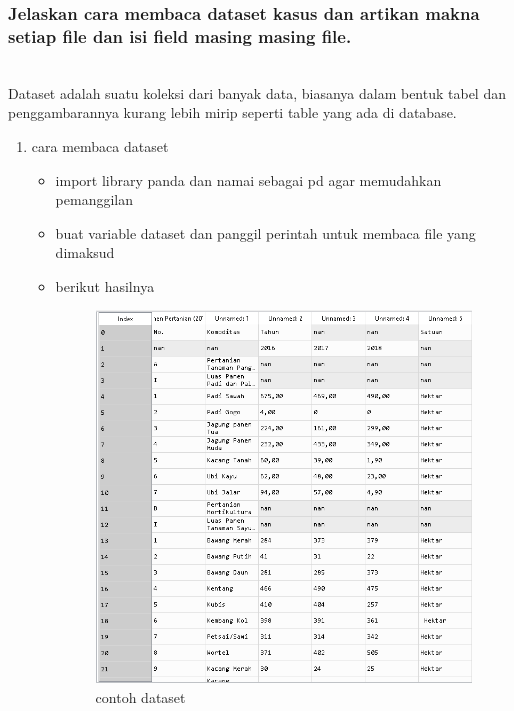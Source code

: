 \subsubsection{Jelaskan cara membaca dataset kasus dan artikan makna setiap ﬁle dan isi ﬁeld masing masing ﬁle.}
\hfill\\
Dataset adalah suatu koleksi dari banyak data, biasanya dalam bentuk tabel dan penggambarannya kurang lebih mirip seperti table yang ada di database.
\begin{enumerate}
\item cara membaca dataset
\hfill\\

	\begin{itemize}
	\item import library panda dan namai sebagai pd agar memudahkan pemanggilan
	\item buat variable dataset dan panggil perintah untuk membaca file yang dimaksud
	\hfill\\	
	\item berikut hasilnya
	\hfill\\
\begin{figure}[H]
	\centering
	\includegraphics[width=12cm]{figures/1174079/3/hasilbacadataset.PNG}
	\caption{contoh dataset}
\end{figure}
\end{itemize}
\end{enumerate}

